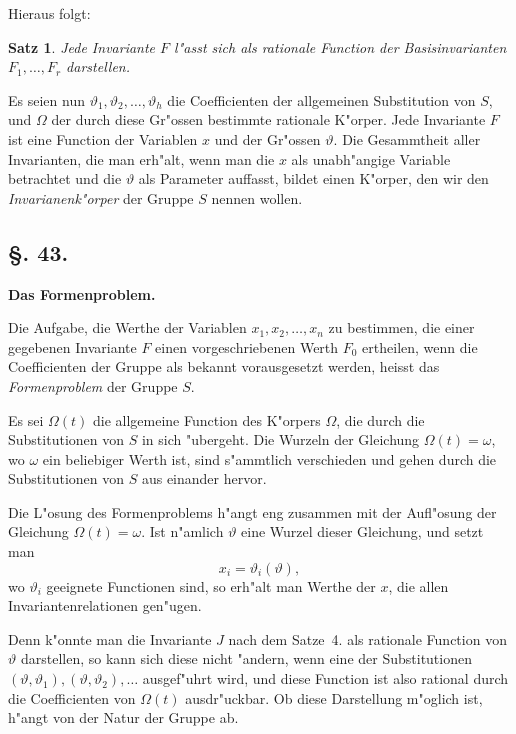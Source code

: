 \documentclass[12pt,a4paper]{article}
\theoremstyle{weber}
\newtheorem{satz}{Satz}[section]
\begin{document}
Hieraus folgt:

\begin{satz}
Jede Invariante $F$ l"asst sich als rationale Function der Basisinvarianten $F_1, \ldots, F_r$ darstellen.
\end{satz}

Es seien nun $\vartheta_1, \vartheta_2, \ldots, \vartheta_h$ die Coefficienten der allgemeinen Substitution von $S$, und $\Omega$ der durch diese Gr"ossen bestimmte rationale K"orper. Jede Invariante $F$ ist eine Function der Variablen $x$ und der Gr"ossen $\vartheta$. Die Gesammtheit aller Invarianten, die man erh"alt, wenn man die $x$ als unabh"angige Variable betrachtet und die $\vartheta$ als Parameter auffasst, bildet einen K"orper, den wir den \textit{Invarianenk"orper} der Gruppe $S$ nennen wollen.

\newpage
\subsection*{\S. 43.}

\begin{center}
\textbf{Das Formenproblem.}
\end{center}

\bigskip

Die Aufgabe, die Werthe der Variablen $x_1, x_2, \ldots, x_n$ zu bestimmen, die einer gegebenen Invariante $F$ einen vorgeschriebenen Werth $F_0$ ertheilen, wenn die Coefficienten der Gruppe als bekannt vorausgesetzt werden, heisst das \textit{Formenproblem} der Gruppe $S$. 

Es sei $\Omega(t)$ die allgemeine Function des K"orpers $\Omega$, die durch die Substitutionen von $S$ in sich "ubergeht. Die Wurzeln der Gleichung $\Omega(t) = \omega$, wo $\omega$ ein beliebiger Werth ist, sind s"ammtlich verschieden und gehen durch die Substitutionen von $S$ aus einander hervor.

Die L"osung des Formenproblems h"angt eng zusammen mit der Aufl"osung der Gleichung $\Omega(t) = \omega$. Ist n"amlich $\vartheta$ eine Wurzel dieser Gleichung, und setzt man
\begin{equation}\label{eq:1}
x_i = \vartheta_i(\vartheta),
\end{equation}
wo $\vartheta_i$ geeignete Functionen sind, so erh"alt man Werthe der $x$, die allen Invariantenrelationen gen"ugen.


Denn k"onnte man die Invariante $J$ nach dem Satze~4. als rationale Function von $\vartheta$ darstellen, so kann sich diese nicht "andern, wenn eine der Substitutionen $(\vartheta, \vartheta_1), (\vartheta, \vartheta_2), \ldots$ ausgef"uhrt wird, und diese Function ist also rational durch die Coefficienten von $\Omega(t)$ ausdr"uckbar. Ob diese Darstellung m"oglich ist, h"angt von der Natur der Gruppe ab.
\end{document}
